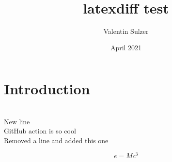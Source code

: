 \documentclass{article}
\title{latexdiff test}
\author{Valentin Sulzer}
\date{April 2021}
\begin{document}
\maketitle

\section{Introduction}

\\New line
\\GitHub action is so cool
\\Removed a line and added this one

\begin{equation}
    e = Mc^3
\end{equation}
\end{document}
